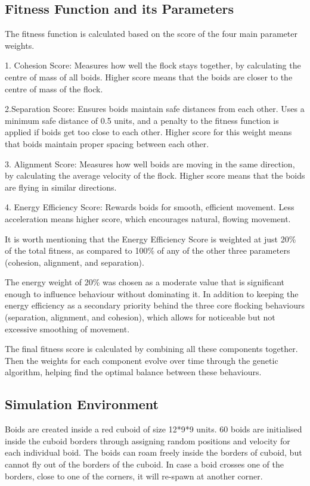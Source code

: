 \documentclass[twocolumn, a4paper, 12pt]{article}
\begin{document}
\subsection{Fitness Function and its Parameters}
The fitness function is calculated based on the score of the four main parameter weights.

1. Cohesion Score: Measures how well the flock stays together, by calculating the centre of mass of all boids. Higher score means that the boids are closer to the centre of mass of the flock.

2.Separation Score: Ensures boids maintain safe distances from each other. Uses a minimum safe distance of 0.5 units, and a penalty to the fitness function is applied if boids get too close to each other. Higher score for this weight means that boids maintain proper spacing between each other.

3. Alignment Score: Measures how well boids are moving in the same direction, by calculating the average velocity of the flock. Higher score means that the boids are flying in similar directions.

4. Energy Efficiency Score: Rewards boids for smooth, efficient movement. Less acceleration means higher score, which encourages natural, flowing movement.

It is worth mentioning that the Energy Efficiency Score is weighted at just 20\% of the total fitness, as compared to 100\% of any of the other three parameters (cohesion, alignment, and separation).

The energy weight of 20\% was chosen as a moderate value that is significant enough to influence behaviour without dominating it. In addition to keeping the energy efficiency as a secondary priority behind the three core flocking behaviours (separation, alignment, and cohesion), which allows for noticeable but not excessive smoothing of movement.

The final fitness score is calculated by combining all these components together. Then the weights for each component evolve over time through the genetic algorithm, helping find the optimal balance between these behaviours.

\subsection{Simulation Environment}
Boids are created inside a red cuboid of size 12*9*9 units. 60 boids are initialised inside the cuboid borders through assigning random positions and velocity for each individual boid. The boids can roam freely inside the borders of cuboid, but cannot fly out of the borders of the cuboid. In case a boid crosses one of the borders, close to one of the corners, it will re-spawn at another corner.
\end{document}
